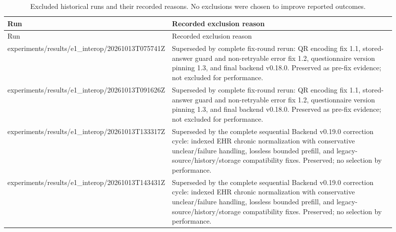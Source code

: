 \begingroup\small\setlength{\tabcolsep}{3pt}\renewcommand{\arraystretch}{1.15}
\begin{longtable}{>{\raggedright\arraybackslash}p{0.31\linewidth}>{\raggedright\arraybackslash}p{0.6\linewidth}}
\caption{Excluded historical runs and their recorded reasons. No exclusions were chosen to improve reported outcomes.}\label{sup:excluded}\\\hline
Run & Recorded exclusion reason \\ \hline
\endfirsthead
\hline
Run & Recorded exclusion reason \\ \hline
\endhead
\hline\endfoot
\hline\endlastfoot
experiments/\allowbreak{}results/\allowbreak{}e1\_\allowbreak{}interop/\allowbreak{}20261013T075741Z & Superseded by complete fix-\allowbreak{}round rerun:\allowbreak{} QR encoding fix 1.\allowbreak{}1, stored-\allowbreak{}answer guard and non-\allowbreak{}retryable error fix 1.\allowbreak{}2, questionnaire version pinning 1.\allowbreak{}3, and final backend v0.\allowbreak{}18.\allowbreak{}0.\allowbreak{} Preserved as pre-\allowbreak{}fix evidence; not excluded for performance.\allowbreak{} \\
experiments/\allowbreak{}results/\allowbreak{}e1\_\allowbreak{}interop/\allowbreak{}20261013T091626Z & Superseded by complete fix-\allowbreak{}round rerun:\allowbreak{} QR encoding fix 1.\allowbreak{}1, stored-\allowbreak{}answer guard and non-\allowbreak{}retryable error fix 1.\allowbreak{}2, questionnaire version pinning 1.\allowbreak{}3, and final backend v0.\allowbreak{}18.\allowbreak{}0.\allowbreak{} Preserved as pre-\allowbreak{}fix evidence; not excluded for performance.\allowbreak{} \\
experiments/\allowbreak{}results/\allowbreak{}e1\_\allowbreak{}interop/\allowbreak{}20261013T133317Z & Superseded by the complete sequential Backend v0.\allowbreak{}19.\allowbreak{}0 correction cycle:\allowbreak{} indexed EHR chronic normalization with conservative unclear/\allowbreak{}failure handling, lossless bounded prefill, and legacy-\allowbreak{}source/\allowbreak{}history/\allowbreak{}storage compatibility fixes.\allowbreak{} Preserved; no selection by performance.\allowbreak{} \\
experiments/\allowbreak{}results/\allowbreak{}e1\_\allowbreak{}interop/\allowbreak{}20261013T143431Z & Superseded by the complete sequential Backend v0.\allowbreak{}19.\allowbreak{}0 correction cycle:\allowbreak{} indexed EHR chronic normalization with conservative unclear/\allowbreak{}failure handling, lossless bounded prefill, and legacy-\allowbreak{}source/\allowbreak{}history/\allowbreak{}storage compatibility fixes.\allowbreak{} Preserved; no selection by performance.\allowbreak{} \\

\end{longtable}
